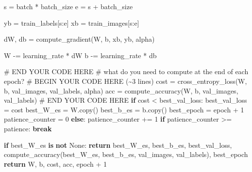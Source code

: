 \documentclass[
  letterpaper,
  DIV=11,
  numbers=noendperiod]{scrartcl}
\newenvironment{Shaded}{\begin{snugshade}}{\end{snugshade}}
\newcommand{\CommentTok}[1]{\textcolor[rgb]{0.37,0.37,0.37}{#1}}
\newcommand{\ControlFlowTok}[1]{\textcolor[rgb]{0.00,0.23,0.31}{\textbf{#1}}}
\newcommand{\DecValTok}[1]{\textcolor[rgb]{0.68,0.00,0.00}{#1}}
\newcommand{\KeywordTok}[1]{\textcolor[rgb]{0.00,0.23,0.31}{\textbf{#1}}}
\newcommand{\NormalTok}[1]{\textcolor[rgb]{0.00,0.23,0.31}{#1}}
\newcommand{\OperatorTok}[1]{\textcolor[rgb]{0.37,0.37,0.37}{#1}}
\newcommand{\RegionMarkerTok}[1]{\textcolor[rgb]{0.00,0.23,0.31}{#1}}
\newcommand{\VariableTok}[1]{\textcolor[rgb]{0.07,0.07,0.07}{#1}}
\begin{document}
\begin{Shaded}
\begin{Highlighting}[]
\NormalTok{            s }\OperatorTok{=}\NormalTok{ batch }\OperatorTok{*}\NormalTok{ batch\_size}
\NormalTok{            e }\OperatorTok{=}\NormalTok{ s }\OperatorTok{+}\NormalTok{ batch\_size}

\NormalTok{            yb }\OperatorTok{=}\NormalTok{ train\_labels[s:e]}
\NormalTok{            xb }\OperatorTok{=}\NormalTok{ train\_images[s:e]}



\NormalTok{            dW, db }\OperatorTok{=}\NormalTok{ compute\_gradient(W, b, xb, yb, alpha)}
            
\NormalTok{            W }\OperatorTok{{-}=}\NormalTok{ learning\_rate }\OperatorTok{*}\NormalTok{ dW}
\NormalTok{            b }\OperatorTok{{-}=}\NormalTok{ learning\_rate }\OperatorTok{*}\NormalTok{ db}


            \CommentTok{\# }\RegionMarkerTok{END}\CommentTok{ YOUR CODE HERE}
        \CommentTok{\# what do you need to compute at the end of each epoch?}
        \CommentTok{\# }\RegionMarkerTok{BEGIN}\CommentTok{ YOUR CODE HERE (\textasciitilde{}3 lines)}
\NormalTok{        cost }\OperatorTok{=}\NormalTok{ cross\_entropy\_loss(W, b, val\_images, val\_labels, alpha)}
\NormalTok{        acc  }\OperatorTok{=}\NormalTok{ compute\_accuracy(W, b, val\_images, val\_labels)}
        \CommentTok{\# }\RegionMarkerTok{END}\CommentTok{ YOUR CODE HERE}
        \ControlFlowTok{if}\NormalTok{ cost }\OperatorTok{\textless{}}\NormalTok{ best\_val\_loss:}
\NormalTok{            best\_val\_loss }\OperatorTok{=}\NormalTok{ cost}
\NormalTok{            best\_W\_es }\OperatorTok{=}\NormalTok{ W.copy()}
\NormalTok{            best\_b\_es }\OperatorTok{=}\NormalTok{ b.copy()}
\NormalTok{            best\_epoch }\OperatorTok{=}\NormalTok{ epoch }\OperatorTok{+} \DecValTok{1}
\NormalTok{            patience\_counter }\OperatorTok{=} \DecValTok{0}
        \ControlFlowTok{else}\NormalTok{:}
\NormalTok{            patience\_counter }\OperatorTok{+=} \DecValTok{1}
            \ControlFlowTok{if}\NormalTok{ patience\_counter }\OperatorTok{\textgreater{}=}\NormalTok{ patience:}
                \ControlFlowTok{break}

    \ControlFlowTok{if}\NormalTok{ best\_W\_es }\KeywordTok{is} \KeywordTok{not} \VariableTok{None}\NormalTok{:}
        \ControlFlowTok{return}\NormalTok{ best\_W\_es, best\_b\_es, best\_val\_loss, compute\_accuracy(best\_W\_es, best\_b\_es, val\_images, val\_labels), best\_epoch}
    \ControlFlowTok{return}\NormalTok{ W, b, cost, acc, epoch }\OperatorTok{+} \DecValTok{1}


\end{Highlighting}
\end{Shaded}
\end{document}
